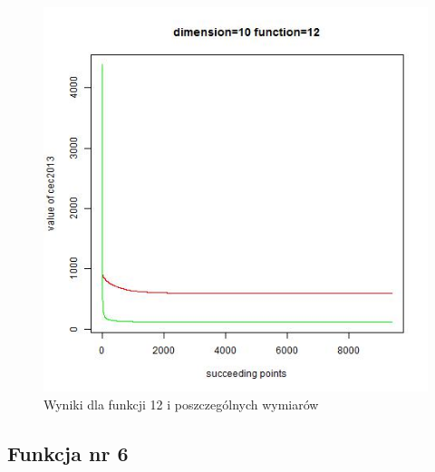 \documentclass{article}
\begin{document}
\begin{figure}[!htb]
\endminipage\hfill
\includegraphics[scale=0.40]{dim_10__func_12}
\caption{Wyniki dla funkcji 12 i poszczególnych wymiarów}
\end{figure}
\newpage

\subsection{Funkcja nr 6}
\end{document}
